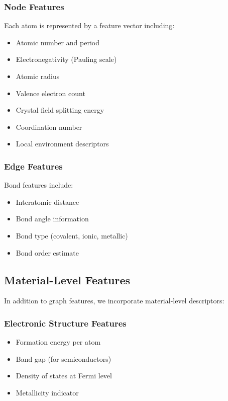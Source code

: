 \documentclass[11pt,a4paper]{article}
\begin{document}
\subsubsection{Node Features}

Each atom is represented by a feature vector including:

\begin{itemize}
    \item Atomic number and period
    \item Electronegativity (Pauling scale)
    \item Atomic radius
    \item Valence electron count
    \item Crystal field splitting energy
    \item Coordination number
    \item Local environment descriptors
\end{itemize}

\subsubsection{Edge Features}

Bond features include:

\begin{itemize}
    \item Interatomic distance
    \item Bond angle information
    \item Bond type (covalent, ionic, metallic)
    \item Bond order estimate
\end{itemize}

\subsection{Material-Level Features}

In addition to graph features, we incorporate material-level descriptors:

\subsubsection{Electronic Structure Features}
\begin{itemize}
    \item Formation energy per atom
    \item Band gap (for semiconductors)
    \item Density of states at Fermi level
    \item Metallicity indicator
\end{itemize}
\end{document}
